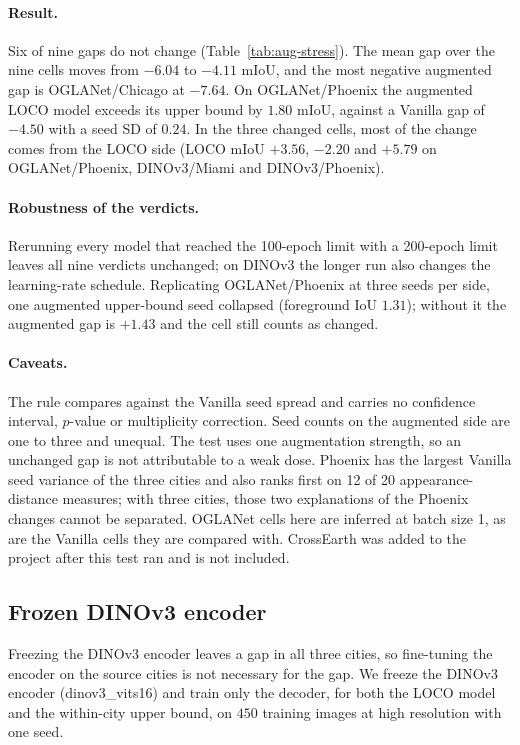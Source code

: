 \paragraph{Result.} Six of nine gaps do not change (Table~\ref{tab:aug-stress}).
The mean gap over the nine cells moves from $-6.04$ to $-4.11$ mIoU, and the
most negative augmented gap is OGLANet/Chicago at $-7.64$.  On OGLANet/Phoenix the
augmented LOCO model exceeds its upper bound by $1.80$ mIoU, against a Vanilla
gap of $-4.50$ with a seed SD of $0.24$.  In the three changed cells, most of the
change comes from the LOCO side (LOCO mIoU $+3.56$, $-2.20$ and $+5.79$ on
OGLANet/Phoenix, DINOv3/Miami and DINOv3/Phoenix).

\paragraph{Robustness of the verdicts.} Rerunning every model that reached the
100-epoch limit with a 200-epoch limit leaves all nine verdicts unchanged; on
DINOv3 the longer run also changes the learning-rate schedule.  Replicating
OGLANet/Phoenix at three seeds per side, one augmented upper-bound seed
collapsed (foreground IoU $1.31$); without it the augmented gap is $+1.43$ and
the cell still counts as changed.

\paragraph{Caveats.} The rule compares against the Vanilla seed spread and
carries no confidence interval, $p$-value or multiplicity correction.  Seed
counts on the augmented side are one to three and unequal.  The test uses one
augmentation strength, so an unchanged gap is not attributable to a weak dose.
Phoenix has the largest Vanilla seed variance of the three cities and also
ranks first on 12 of 20 appearance-distance measures; with three cities, those two
explanations of the Phoenix changes cannot be separated.  OGLANet cells here are
inferred at batch size 1, as are the Vanilla cells they are compared with.
CrossEarth was added to the project after this test ran and is not included.

\subsection{Frozen DINOv3 encoder}
\label{app:frozen}

Freezing the DINOv3 encoder leaves a gap in all three cities, so fine-tuning the encoder on
the source cities is not necessary for the gap. We freeze the DINOv3 encoder
(dinov3\_vits16) and train only the decoder, for both the LOCO model and the within-city
upper bound, on $450$ training images at high resolution with one seed.

